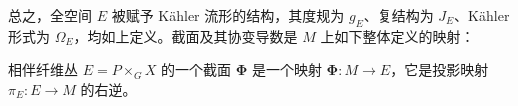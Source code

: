 
总之，全空间 $E$ 被赋予 Kähler 流形的结构，其度规为 $g_E$、复结构为 $J_E$、Kähler 形式为 $\Omega_E$，均如上定义。截面及其协变导数是 $M$ 上如下整体定义的映射：

\begin{definition}
相伴纤维丛 $E=P\times_G X$ 的一个截面 $\bm{\Phi}$ 是一个映射 $\bm{\Phi}: M\to E$，它是投影映射 $\pi_E: E\to M$ 的右逆。
\end{definition}
